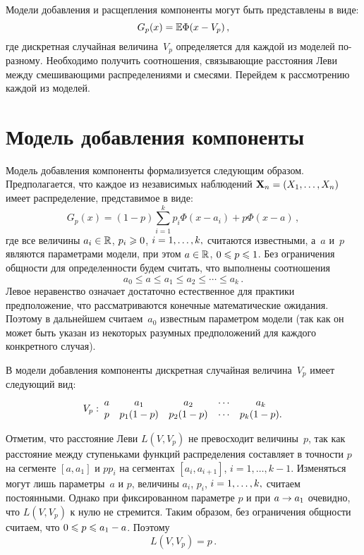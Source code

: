 \begin{multicols}{2}
Модели добавления и расщепления компоненты могут быть
представлены в виде:
$$
G_p(x)=\mathbb E\Phi(x-V_p)\,,
$$
где дискретная случайная величина~$V_p$ определяется для каждой из
моделей по-раз\-но\-му. Необходимо получить соотношения, связывающие
расстояния Леви между смешивающими распределениями и смесями.
Перейдем к рассмотрению каждой из моделей.

\section{Модель добавления компоненты}

Модель добавления компоненты формализуется следующим образом.
Предполагается, что каждое из независимых наблюдений
$\mathbf{X}_n\hm=(X_1,\ldots,X_n)$ имеет распределение,
представимое в виде:
\begin{equation}
\label{Stab_G_p1}
G_p(x)=(1-p)\sum\limits_{i=1}^k
p_i\Phi(x-a_i)+p\Phi(x-a)\,,
\end{equation}
где все величины $a_i\in\mathbb R$, $p_i\hm\geqslant 0$, $i\hm=1,\ldots,k,$ считаются
известными, а~$a$ и~$p$ являются параметрами модели, при этом
$a\hm\in\R$, $0\hm\leqslant p\hm\leqslant 1$. Без ограничения общности для
определенности будем считать, что выполнены соотношения
\begin{equation}
\label{Stab_a1}
a_0\leqslant a\leqslant a_1\leqslant a_2\leqslant\cdots\leqslant a_k\,.
\end{equation}
%
Левое неравенство означает достаточно естест\-вен\-ное для практики
предположение, что рас\-смат\-ри\-ва\-ют\-ся конечные математические
ожидания. Поэтому в дальнейшем считаем~$a_0$ известным
параметром модели (так как он может быть указан из некоторых разумных
предположений для каждого конкретного случая).

В модели добавления компоненты дискретная случайная величина~$V_p$
имеет следующий вид:
\begin{equation}
\label{Stab_V_p1} 
V_p:\!\!
\begin{tabular}{ccccc}
$a$\!&$a_1$\!&$a_2$\!&$\cdots$\!\!&$a_k$\\
$p$\!&$p_1(1-p)$\!&$p_2(1-p)$\!&$\cdots$\!\!&$p_k(1-p)$.
\end{tabular}\!\!\!
\end{equation}

Отметим, что расстояние Леви $L(V,V_p)$ не превосходит величины~$p$,
так как расстояние между ступеньками функций распределения
составляет в точности $p$ на сегменте $[a,a_1]$ и $p p_i$ на сегментах
$[a_i,a_{i+1}]$, $i=1,\ldots,k-1$. Изменяться могут лишь параметры~$a$ и
$p$, величины $a_i$, $p_i$, $i\hm=1,\ldots,k,$ считаем постоянными. Однако
при фиксированном параметре $p$ и при $a\hm\to a_1$
очевидно, что $L(V,V_p)$ к нулю не стремится. Таким образом,
без ограничения общности считаем, что $0\hm\leqslant p\hm\leqslant a_1- a$. Поэтому
\begin{equation}
\label{Stab_Cond1} 
L(V,V_p)=p\,.
\end{equation}


\end{multicols}
